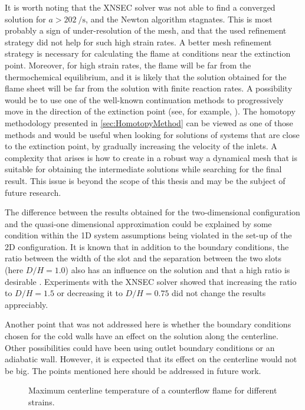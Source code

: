 It is worth noting that the XNSEC solver was not able to find a converged solution for $a > \SI{202}{\per\second}$, and the Newton algorithm stagnates. This is most probably a sign of under-resolution of the mesh, and that the used refinement strategy did not help for such high strain rates. A better mesh refinement strategy is necessary for calculating the flame at conditions near the extinction point. 
Moreover, for high strain rates, the flame will be far from the thermochemical equilibrium, and it is likely that the solution obtained for the flame sheet will be far from the solution with finite reaction rates. A possibility would be to use one of the well-known continuation methods to progressively move in the direction of the extinction point (see, for example, \textcite{nishiokaFlamecontrollingContinuationMethod1996}). The homotopy methodology presented in \cref{sec:HomotopyMethod} can be viewed as one of those methods and would be useful when looking for solutions of systems that are close to the extinction point, by gradually increasing the velocity of the inlets. A complexity that arises is how to create in a robust way a dynamical mesh that is suitable for obtaining the intermediate solutions while searching for the final result. This issue is beyond the scope of this thesis and may be the subject of future research.


The difference between the results obtained for the two-dimensional configuration and the quasi-one dimensional approximation could be explained by some condition within the 1D system assumptions being violated in the set-up of the 2D configuration. It is known that in addition to the boundary conditions, the ratio between the width of the slot and the separation between the two slots (here $D/H = 1.0$) also has an influence on the solution and that a high ratio is desirable \parencite{frouzakisTwodimensionalDirectNumerical1998}. Experiments with the XNSEC solver showed that increasing the ratio to $D/H = 1.5$  or decreasing it to $D/H = 0.75$ did not change the results appreciably.

Another point that was not addressed here is whether the boundary conditions chosen for the cold walls have an effect on the solution along the centerline. Other possibilities could have been using outlet boundary conditions or an adiabatic wall. However, it is expected that its effect on the centerline would not be big. The points mentioned here should be addressed in future work.

\begin{figure}[t]
	\centering
	\caption{Maximum centerline temperature of a counterflow flame for different strains.}
	\label{fig:TemperatureStrainPlot}
\end{figure}
